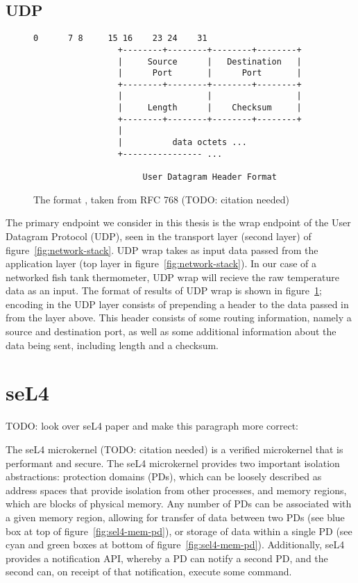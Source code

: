 \documentclass[twoside]{memoir}
\begin{document}
\subsection{UDP}
\begin{figure}[htb]
    \centering
\begin{lstlisting}[language=file]
                  0      7 8     15 16    23 24    31
                 +--------+--------+--------+--------+
                 |     Source      |   Destination   |
                 |      Port       |      Port       |
                 +--------+--------+--------+--------+
                 |                 |                 |
                 |     Length      |    Checksum     |
                 +--------+--------+--------+--------+
                 |
                 |          data octets ...
                 +---------------- ...

                      User Datagram Header Format
\end{lstlisting}
    \caption{The format , taken from RFC 768 (TODO: citation needed)}
    \label{fig:udp-wrap-rfc}
\end{figure}
The primary endpoint we consider in this thesis is
the wrap endpoint of the User Datagram Protocol (UDP),
seen in the transport layer (second layer) of figure~\ref{fig:network-stack}.
UDP wrap takes as input data passed from the application layer (top layer in figure~\ref{fig:network-stack}).
In our case of a networked fish tank thermometer, UDP wrap will recieve the raw temperature data as an input.
The format of results of UDP wrap is shown in figure~\ref{fig:udp-wrap-rfc};
encoding in the UDP layer consists of prepending a header
to the data passed in from the layer above.
This header consists of some routing information, namely a source and
destination port, as well as some additional information about the
data being sent, including length and a checksum.



\section{seL4}

TODO: look over seL4 paper and make this paragraph more correct:

The seL4 microkernel (TODO: citation needed) is a verified microkernel
that is performant and secure.
The seL4 microkernel provides two important isolation abstractions:
protection domains (PDs),
which can be loosely described as address spaces that provide isolation from
other processes,
and memory regions, which are blocks of physical memory.
Any number of PDs can be associated with a given memory region,
allowing for transfer of data between two PDs 
(see blue box at top of figure~\ref{fig:sel4-mem-pd}),
or storage of data within
a single PD
(see cyan and green boxes at bottom of figure~\ref{fig:sel4-mem-pd}).
Additionally, seL4 provides a notification API,
whereby a PD can notify a second PD, and the second can,
on receipt of that notification, execute some command.
\end{document}
